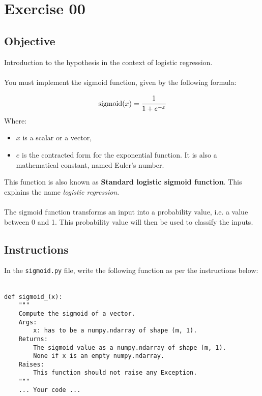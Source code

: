 \chapter{Exercise 00}

\newpage
{}
\makeheaderfilesforbidden

\section*{Objective}
Introduction to the hypothesis in the context of logistic regression.\\
\\
You must implement the sigmoid function, given by the following formula:

$$
\text{sigmoid}(x) = \cfrac{1} {1 + e^{-x}}
$$
Where:
\begin{itemize}
  \item $x$ is a scalar or a vector,
  \item $e$ is the contracted form for the exponential function. It is also a mathematical constant, named Euler's number.
\end{itemize}
This function is also known as \textbf{Standard logistic sigmoid function}.
This explains the name \textit{logistic regression}.\\
\\
The sigmoid function transforms an input into a probability value, i.e. a value between 0 and 1.  
This probability value will then be used to classify the inputs.
\\
\section*{Instructions}
In the \texttt{sigmoid.py} file, write the following function as per the instructions below:\\
\\
\par
\begin{verbatim}
def sigmoid_(x):
    """
    Compute the sigmoid of a vector.
    Args:
        x: has to be a numpy.ndarray of shape (m, 1).
    Returns: 
        The sigmoid value as a numpy.ndarray of shape (m, 1).
        None if x is an empty numpy.ndarray.
    Raises:
        This function should not raise any Exception.
    """
    ... Your code ...
\end{verbatim}

